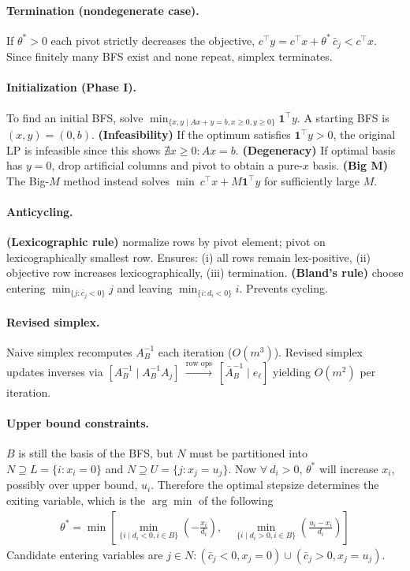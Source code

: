 \documentclass{article}
\begin{document}
\paragraph{Termination (nondegenerate case).}
If $\theta^*>0$ each pivot strictly decreases the objective, $c^\top y = c^\top x + \theta^*\,\bar c_j < c^\top x$.
Since finitely many BFS exist and none repeat, simplex terminates.


\paragraph{Initialization (Phase I).}
To find an initial BFS, solve 
$\min_{\{x, y \mid Ax + y = b, x\geq 0, y \geq 0\}} \mathbf{1}^\top y$.
A starting BFS is $(x,y)=(0,b)$.
\textbf{(Infeasibility)} If the optimum satisfies $\mathbf{1}^\top y>0$, the original LP is infeasible since this shows $\nexists x \geq 0 : Ax = b$.
\textbf{(Degeneracy)} If optimal basis has $y=0$, drop artificial columns and pivot to obtain a pure-$x$ basis.
\textbf{(Big M)} The Big-$M$ method instead solves $\min\ c^\top x + M\mathbf{1}^\top y$ for sufficiently large $M$.

\paragraph{Anticycling.}
\textbf{(Lexicographic rule)} normalize rows by pivot element; pivot on lexicographically smallest row.
Ensures: (i) all rows remain lex-positive, (ii) objective row increases lexicographically, (iii) termination.
\textbf{(Bland's rule)} choose entering $\min_{\{j:\bar c_j<0\}}j$ and leaving $\min_{\{i: d_i<0\}}i$. Prevents cycling.


\paragraph{Revised simplex.}
Naive simplex recomputes $A_B^{-1}$ each iteration ($O(m^3)$). Revised simplex updates inverses via 
$[A_B^{-1} \mid A_B^{-1}A_j]\ \xrightarrow{\text{row ops}}\ [\bar A_B^{-1} \mid e_\ell] $
yielding $O(m^2)$ per iteration.

\paragraph{Upper bound constraints.} $B$ is still the basis of the BFS, but $N$ must be partitioned into $N\supseteq L=\{i:x_i=0\}$ and $N\supseteq U=\{ j:x_j = u_j\}$. Now $\forall\ d_i > 0$, $\theta^*$ will increase $x_i$, possibly over upper bound, $u_i$. Therefore the optimal stepsize determines the exiting variable, which is the $\arg\min$ of the following
\begin{align*}
    \theta^* = \min \left[ \min_{\{i \mid d_i < 0, i\in B\}}\left(- \frac{x_i}{d_i}\right),\quad \min_{\{i \mid d_i > 0, i\in B\}}\left(\frac{u_i - x_i}{d_i}\right)\right]
\end{align*}
Candidate entering variables are $j\in N: (\bar c_j < 0, x_j = 0) \cup (\bar c_j > 0, x_j = u_j)$. 
\end{document}
